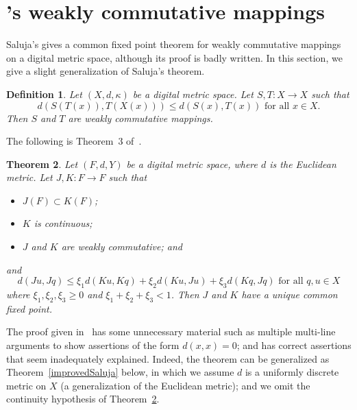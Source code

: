 \documentclass{article}
\newtheorem{thm}{Theorem}
\newtheorem{definition}[thm]{Definition}
\numberwithin{thm}{section}
\begin{document}
\section{\cite{Saluja}'s weakly commutative mappings}
Saluja's \cite{Saluja} gives a common fixed point 
theorem for weakly commutative mappings on a digital
metric space, although its proof is badly written.
In this section, we give a slight generalization
of Saluja's theorem.

\begin{definition}
    {\rm \cite{RaniEtAl}} Let $(X,d,\kappa)$ be a digital metric space.
    Let $S,T: X \to X$ such that
    \begin{equation}
        \label{weaklyCommutIneq}
        d(S(T(x)),T(X(x))) \le d(S(x),T(x)) \mbox{  for all  } x \in X.
    \end{equation}
    Then $S$ and $T$ are {\em weakly commutative} mappings.
\end{definition}

The following is Theorem~3 of~\cite{Saluja}.

\begin{thm}
    \label{SalujaThm3}
    Let $(F,d, Y)$ be a digital metric space, where $d$ is the
    Euclidean metric. Let $J,K: F \to F$ such that
    \begin{itemize}
        \item $J(F) \subset K(F)$;
        \item $K$ is continuous;
        \item $J$ and $K$ are weakly commutative; and
        
    \end{itemize}
    and 
\begin{equation}
\label{SalIneq}
     d(Ju, Jq) \le \xi_1 d(Ku,Kq) + \xi_2 d(Ku,Ju) +
     \xi_3 d(Kq,Jq) \mbox{ for all }
              q,u \in X
\end{equation}
where  $\xi_1, \xi_2, \xi_3 \ge 0$ and
$\xi_1 + \xi_2 + \xi_3 < 1$. Then $J$ and $K$ have a unique common fixed point.
\end{thm}

The proof given in~\cite{Saluja} has some unnecessary 
material such as multiple multi-line arguments
to show assertions of the form
$d(x, x)=0$; and has correct assertions
that seem inadequately explained. Indeed, the
theorem can be generalized as 
Theorem~\ref{improvedSaluja} below, in which we
assume $d$ is a uniformly discrete metric on $X$ 
(a generalization of the Euclidean metric); and we omit
the continuity hypothesis of Theorem~\ref{SalujaThm3}.
\end{document}
